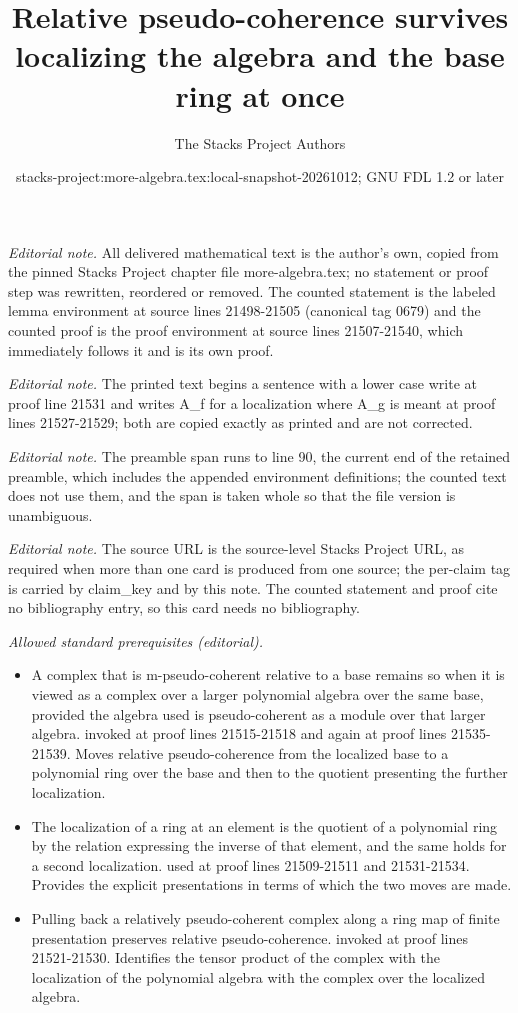 \documentclass[10pt,a4paper]{amsart}
\title{Relative pseudo-coherence survives localizing the algebra and the base ring at once}
\author{The Stacks Project Authors}
\date{stacks-project:more-algebra.tex:local-snapshot-20261012; GNU FDL 1.2 or later}
\theoremstyle{plain}
\theoremstyle{definition}
\theoremstyle{remark}
\numberwithin{equation}{subsection}
\begin{document}
\maketitle
\setcounter{subsection}{1}
\noindent\textit{Editorial note.} All delivered mathematical text is the author's own, copied from the pinned Stacks Project chapter file more-algebra.tex; no statement or proof step was rewritten, reordered or removed. The counted statement is the labeled lemma environment at source lines 21498-21505 (canonical tag 0679) and the counted proof is the proof environment at source lines 21507-21540, which immediately follows it and is its own proof.\par\medskip
\noindent\textit{Editorial note.} The printed text begins a sentence with a lower case write at proof line 21531 and writes A\_f for a localization where A\_g is meant at proof lines 21527-21529; both are copied exactly as printed and are not corrected.\par\medskip
\noindent\textit{Editorial note.} The preamble span runs to line 90, the current end of the retained preamble, which includes the appended environment definitions; the counted text does not use them, and the span is taken whole so that the file version is unambiguous.\par\medskip
\noindent\textit{Editorial note.} The source URL is the source-level Stacks Project URL, as required when more than one card is produced from one source; the per-claim tag is carried by claim\_key and by this note. The counted statement and proof cite no bibliography entry, so this card needs no bibliography.\par\medskip
\noindent\textit{Allowed standard prerequisites (editorial).}\begin{itemize}
\item A complex that is m-pseudo-coherent relative to a base remains so when it is viewed as a complex over a larger polynomial algebra over the same base, provided the algebra used is pseudo-coherent as a module over that larger algebra. invoked at proof lines 21515-21518 and again at proof lines 21535-21539. Moves relative pseudo-coherence from the localized base to a polynomial ring over the base and then to the quotient presenting the further localization.
\item The localization of a ring at an element is the quotient of a polynomial ring by the relation expressing the inverse of that element, and the same holds for a second localization. used at proof lines 21509-21511 and 21531-21534. Provides the explicit presentations in terms of which the two moves are made.
\item Pulling back a relatively pseudo-coherent complex along a ring map of finite presentation preserves relative pseudo-coherence. invoked at proof lines 21521-21530. Identifies the tensor product of the complex with the localization of the polynomial algebra with the complex over the localized algebra.
\end{itemize}\medskip
\end{document}
